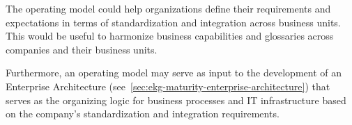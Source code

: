 %
%
The operating model could help organizations define their requirements
and expectations in terms of standardization and integration across business units.
This would be useful to harmonize business capabilities and glossaries
across companies and their business units.

Furthermore, an operating model may serve as input to the development of an Enterprise Architecture
(see~\ref{sec:ekg-maturity-enterprise-architecture}) that serves as the organizing logic for business processes
and IT infrastructure based on the company’s standardization and integration requirements.

